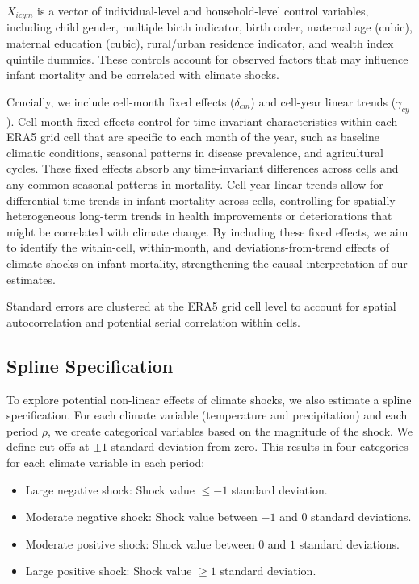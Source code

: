 \documentclass[12pt]{article}
\begin{document}
\(X_{icym}\) is a vector of individual-level and household-level control variables, including child gender, multiple birth indicator, birth order, maternal age (cubic), maternal education (cubic), rural/urban residence indicator, and wealth index quintile dummies. These controls account for observed factors that may influence infant mortality and be correlated with climate shocks.

Crucially, we include cell-month fixed effects (\(\delta_{cm}\)) and cell-year linear trends (\(\gamma_{cy}\)).  Cell-month fixed effects control for time-invariant characteristics within each ERA5 grid cell that are specific to each month of the year, such as baseline climatic conditions, seasonal patterns in disease prevalence, and agricultural cycles.  These fixed effects absorb any time-invariant differences across cells and any common seasonal patterns in mortality.  Cell-year linear trends allow for differential time trends in infant mortality across cells, controlling for spatially heterogeneous long-term trends in health improvements or deteriorations that might be correlated with climate change.  By including these fixed effects, we aim to identify the within-cell, within-month, and deviations-from-trend effects of climate shocks on infant mortality, strengthening the causal interpretation of our estimates.

Standard errors are clustered at the ERA5 grid cell level to account for spatial autocorrelation and potential serial correlation within cells.

\subsection{Spline Specification}

To explore potential non-linear effects of climate shocks, we also estimate a spline specification.  For each climate variable (temperature and precipitation) and each period \(\rho\), we create categorical variables based on the magnitude of the shock.  We define cut-offs at \(\pm 1\) standard deviation from zero.  This results in four categories for each climate variable in each period:

\begin{itemize}
    \item  Large negative shock:  Shock value \(\leq -1\) standard deviation.
    \item  Moderate negative shock: Shock value between \(-1\) and \(0\) standard deviations.
    \item  Moderate positive shock: Shock value between \(0\) and \(1\) standard deviations.
    \item  Large positive shock: Shock value \(\geq 1\) standard deviation.
\end{itemize}
\end{document}
